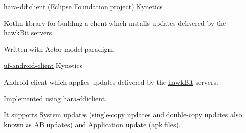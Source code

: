 \newpage
{}


\begin{cventries}

  \cventry
    {\href{https://github.com/eclipse-hara/hara-ddiclient}{\underline{hara-ddiclient}} (Eclipse Foundation project)} %
    {Kynetics} %
    {} %
    {} %
    {
    \begin{cvitems}
    		\item Kotlin library for building a client which installs updates delivered by the \href{https://eclipse.dev/hawkit/}{\underline{hawkBit}} servers.
    		\item Written with Actor model paradigm.
    \end{cvitems}
    }

  \cventry
    {\href{https://github.com/Kynetics/uf-android-client}{\underline{uf-android-client}}} %
    {Kynetics} %
    {} %
    {} %
    {
    \begin{cvitems}
      \item Android client which applies updates delivered by the \href{https://eclipse.dev/hawkit/}{\underline{hawkBit}} servers.
    	  \item Implemented using hara-ddiclient.
    	  \item It supports System updates (single-copy updates and double-copy updates also known as AB updates) and Application update (apk files).
    \end{cvitems}
    }

\end{cventries}

